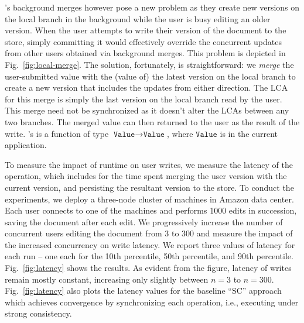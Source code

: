 \quark's background merges however pose a new problem as they create
new versions on the local branch in the background while the user is
busy editing an older version. When the user attempts to write their
version of the document to the store, simply committing it would
effectively override the concurrent updates from other users obtained
via background merges. This problem is depicted in
Fig.~\ref{fig:local-merge}. The solution, fortunately, is
straightforward: we \emph{merge} the user-submitted value with the
(value of) the latest version on the local branch to create a new
version that includes the updates from either direction. The LCA for
this merge is simply the last version on the local branch read by the
user. This merge need not be synchronized as it doesn't alter the LCAs
between any two branches. The merged value can then returned
to the user as the result of the write.  \quark's  is a
function of type $\texttt{Value} \rightarrow \texttt{Value}$, where
$\texttt{Value}$ is  in the current application.

To measure the impact of \quark runtime on user writes, we measure the
latency of the  operation, which includes for the time spent
merging the user version with the current version, and persisting the
resultant version to the store. To conduct the experiments, we deploy
a three-node cluster of  machines in Amazon 
data center. Each user connects to one of the machines and performs
1000 edits in succession, saving the document after each edit. We
progressively increase the number of concurrent users editing the
document from 3 to 300 and measure the impact of the increased
concurrency on write latency. We report three values of latency for
each run -- one each for the 10th percentile, 50th percentile, and
90th percentile.  Fig.~\ref{fig:latency} shows the results. As evident
from the figure, latency of \quark writes remain mostly constant,
increasing only slightly between $n=3$ to $n=300$.
Fig.~\ref{fig:latency} also plots the latency values for the baseline
``SC'' approach which achieves convergence by synchronizing each
operation, i.e., executing under strong consistency.

